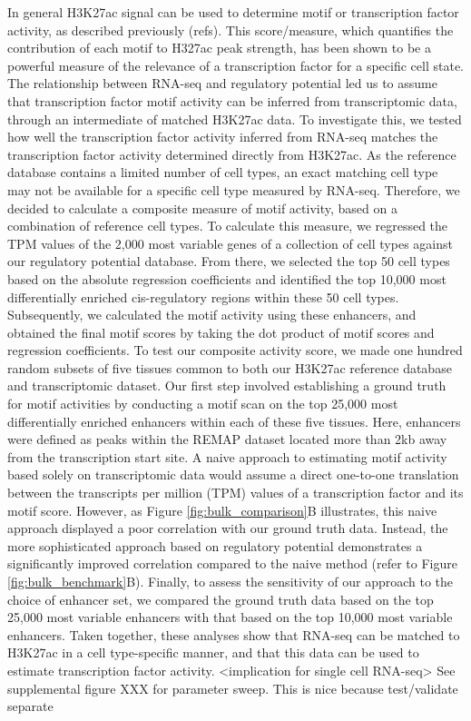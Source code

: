 In general H3K27ac signal can be used to determine motif or transcription factor activity, as described previously (refs). This score/measure, which quantifies the contribution of each motif to H327ac peak strength, has been shown to be a powerful measure of the relevance of a transcription factor for a specific cell state. The relationship between RNA-seq and regulatory potential led us to assume that transcription factor motif activity can be inferred from transcriptomic data, through an intermediate of matched H3K27ac data. To investigate this, we tested how well the transcription factor activity inferred from RNA-seq matches the transcription factor activity determined directly from H3K27ac. As the reference database contains a limited number of cell types, an exact matching cell type may not be available for a specific cell type measured by RNA-seq. Therefore, we decided to calculate a composite measure of motif activity, based on a combination of reference cell types. To calculate this measure, we regressed the TPM values of the 2,000 most variable genes of a collection of cell  types against our regulatory potential database. From there, we selected the top 50 cell types based on the absolute regression coefficients and identified the top 10,000 most differentially enriched cis-regulatory regions within these 50 cell types. Subsequently, we calculated the motif activity using these enhancers, and obtained the final motif scores by taking the dot product of motif scores and regression coefficients. To test our composite activity score, we made one hundred random subsets of five tissues common to both our H3K27ac reference database and transcriptomic dataset. Our first step involved establishing a ground truth for motif activities by conducting a motif scan on the top 25,000 most differentially enriched enhancers within each of these five tissues. Here, enhancers were defined as peaks within the REMAP dataset located more than 2kb away from the transcription start site. A naive approach to estimating motif activity based solely on transcriptomic data would assume a direct one-to-one translation between the transcripts per million (TPM) values of a transcription factor and its motif score. However, as Figure \ref{fig:bulk_comparison}B illustrates, this naive approach displayed a poor correlation with our ground truth data. Instead,  the more sophisticated approach based on regulatory potential demonstrates a significantly improved correlation compared to the naive method (refer to Figure \ref{fig:bulk_benchmark}B). Finally, to assess the sensitivity of our approach to the choice of enhancer set, we compared the ground truth data based on the top 25,000 most variable enhancers with that based on the top 10,000 most variable enhancers.
Taken together, these analyses show that RNA-seq can be matched to H3K27ac in a cell type-specific manner, and that this data can be used to estimate transcription factor activity. <implication for single cell RNA-seq> 
See supplemental figure XXX for parameter sweep. This is nice because test/validate separate

